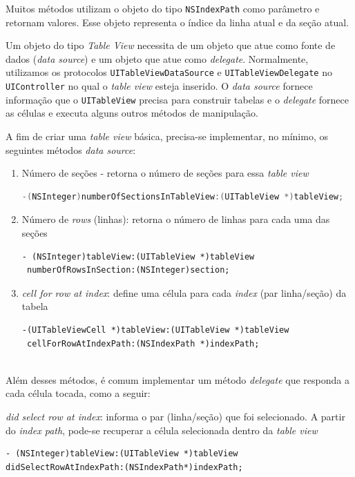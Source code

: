 	Muitos métodos utilizam o objeto do tipo \texttt{NSIndexPath} como parâmetro e retornam valores. Esse objeto representa o índice da linha atual e da seção atual.
    
	Um objeto do tipo \emph{Table View} necessita de um objeto que atue como fonte de dados (\emph{data source}) e um objeto que atue como \emph{delegate}. Normalmente, utilizamos os protocolos \texttt{UITableViewDataSource} e \texttt{UITableViewDelegate} no \texttt{UIController} no qual o \emph{table view} esteja inserido. O \emph{data source} fornece informação que o \texttt{UITableView} precisa para construir tabelas e o \emph{delegate} fornece as células e executa alguns outros métodos de manipulação.
    
	A fim de criar uma \emph{table view} básica, precisa-se implementar, no mínimo, os seguintes métodos \emph{data source}:
\begin{enumerate}
\item Número de seções - retorna o número de seções para essa \emph{table view}

\begin{lstlisting}[language=C]   
-(NSInteger)numberOfSectionsInTableView:(UITableView *)tableView;
\end{lstlisting}   
	   
\item Número de \emph{rows} (linhas): retorna o número de linhas para cada uma das seções

\begin{lstlisting}  
- (NSInteger)tableView:(UITableView *)tableView
 numberOfRowsInSection:(NSInteger)section;  
\end{lstlisting}  
   
\item \emph{cell for row at index}: define uma célula para cada \emph{index} (par linha/seção) da tabela
\begin{lstlisting}    
-(UITableViewCell *)tableView:(UITableView *)tableView
 cellForRowAtIndexPath:(NSIndexPath *)indexPath;
     
\end{lstlisting}

\end{enumerate} 

    Além desses métodos, é comum implementar um método \emph{delegate} que responda a cada célula tocada, como a seguir:
 
    \emph{did select row at index}: informa o par (linha/seção) que foi selecionado. A partir do \emph{index path}, pode-se recuperar a célula selecionada dentro da \emph{table view}
\begin{lstlisting}
- (NSInteger)tableView:(UITableView *)tableView 
didSelectRowAtIndexPath:(NSIndexPath*)indexPath;  
\end{lstlisting}   
     
